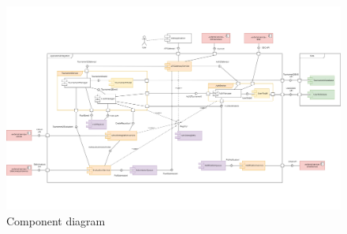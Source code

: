 \newpage
\thispagestyle{noheader}
\begin{figure}[H]
    \centering
    \vspace{-3.5cm}
    \includegraphics[width=1.6\textwidth,angle=90,origin=c]{Diagrams/component_diagram.png}
    \caption{Component diagram}
    \label{component_diagram}
\end{figure}

